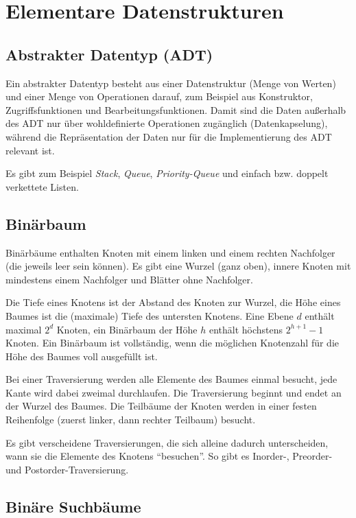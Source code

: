 \documentclass[12pt]{article}
\begin{document}
\section{Elementare Datenstrukturen}

\subsection{Abstrakter Datentyp (ADT)}

Ein abstrakter Datentyp besteht aus einer Datenstruktur (Menge von Werten) und einer Menge von Operationen darauf, zum Beispiel aus Konstruktor, Zugriffsfunktionen und Bearbeitungsfunktionen. Damit sind die Daten außerhalb des ADT nur über wohldefinierte Operationen zugänglich (Datenkapselung), während die Repräsentation der Daten nur für die Implementierung des ADT relevant ist.

Es gibt zum Beispiel \textit{Stack}, \textit{Queue}, \textit{Priority-Queue} und einfach bzw. doppelt verkettete Listen.

\subsection{Binärbaum}

Binärbäume enthalten Knoten mit einem linken und einem rechten Nachfolger (die jeweils leer sein können). Es gibt eine Wurzel (ganz oben), innere Knoten mit mindestens einem Nachfolger und Blätter ohne Nachfolger.

Die Tiefe eines Knotens ist der Abstand des Knoten zur Wurzel, die Höhe eines Baumes ist die (maximale) Tiefe des untersten Knotens. Eine Ebene $d$ enthält maximal $2^d$ Knoten, ein Binärbaum der Höhe $h$ enthält höchstens $2^{h+1}-1$ Knoten. Ein Binärbaum ist vollständig, wenn die möglichen Knotenzahl für die Höhe des Baumes voll ausgefüllt ist.

Bei einer Traversierung werden alle Elemente des Baumes einmal besucht, jede Kante wird dabei zweimal durchlaufen. Die Traversierung beginnt und endet an der Wurzel des Baumes. Die Teilbäume der Knoten werden in einer festen Reihenfolge (zuerst linker, dann rechter Teilbaum) besucht.

Es gibt verscheidene Traversierungen, die sich alleine dadurch unterscheiden, wann sie die Elemente des Knotens \enquote{besuchen}. So gibt es Inorder-, Preorder- und Postorder-Traversierung.

\subsection{Binäre Suchbäume}
\end{document}
